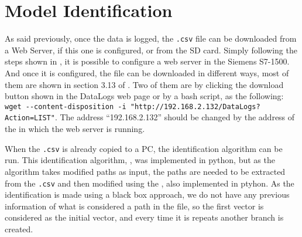 \section{Model Identification}
As said previously, once the data is logged, the \verb|.csv| file can be downloaded from a Web Server, if
this one is configured, or from the SD card. Simply following the steps shown in
\cite{webserverSiemens}, it is possible to configure a web server in the Siemens
\PLC S7-1500. And once it is configured, the file can be downloaded in different
ways, most of them are shown in section 3.13 of \cite{webserverSiemens}. Two of
them are by clicking
the download button shown in the DataLogs web page or by a bash script, as the following: \newline
\verb|wget --content-disposition -i "http://192.168.2.132/DataLogs?Action=LIST"|.
The address ``192.168.2.132'' should be changed by the address of the \PLC{} in which
the web server is running.

When the \verb|.csv| is already copied to a PC, the identification algorithm can
be run. This identification algorithm, , was
implemented in python, but as the algorithm takes modified paths as input, the paths
are needed to be extracted from the \verb|.csv| and then modified using the
, also implemented in ptyhon. As the identification is
made using a black box approach, we do not have any previous information of what is
considered a path in the file, so the first vector is considered as the initial
vector, and every time it is repeats another branch is created.

